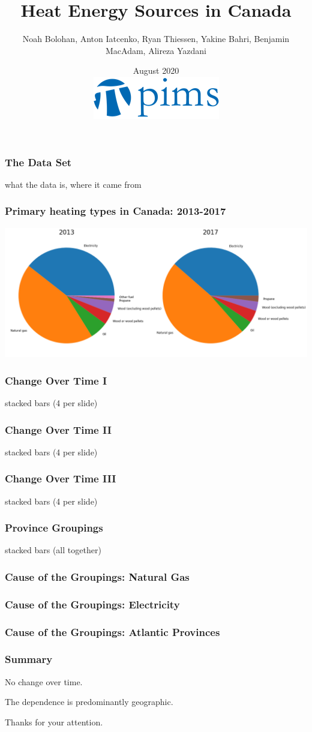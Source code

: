 \documentclass{beamer}
\title{Heat Energy Sources in Canada}
\author{Noah Bolohan, Anton Iatcenko, Ryan Thiessen, Yakine Bahri, Benjamin MacAdam, Alireza Yazdani}
\institute{Math\textsuperscript{Industry}}
\date{August 2020  \\ \vspace{30pt} \includegraphics[scale=0.3]{pims_logo.png} }
\begin{document}
\frame{\titlepage}

\begin{frame}
\frametitle{The Data Set}
what the data is, where it came from
\end{frame}


\begin{frame}
\frametitle{Primary heating types in Canada: 2013-2017}
\includegraphics[width=\textwidth]{Canada20132017.png}
\end{frame}


\begin{frame}
\frametitle{Change Over Time I}
stacked bars (4 per slide)
\end{frame}


\begin{frame}
\frametitle{Change Over Time II}
stacked bars (4 per slide)
\end{frame}


\begin{frame}
\frametitle{Change Over Time III}
stacked bars (4 per slide)
\end{frame}


\begin{frame}
\frametitle{Province Groupings}
stacked bars (all together)
\end{frame}


\begin{frame}
\frametitle{Cause of the Groupings: Natural Gas}

\end{frame}


\begin{frame}
\frametitle{Cause of the Groupings: Electricity}

\end{frame}


\begin{frame}
\frametitle{Cause of the Groupings: Atlantic Provinces}

\end{frame}



\begin{frame}
\frametitle{Summary}

No change over time. 

The dependence is predominantly geographic. 

Thanks for your attention.  

\end{frame}
\end{document}
